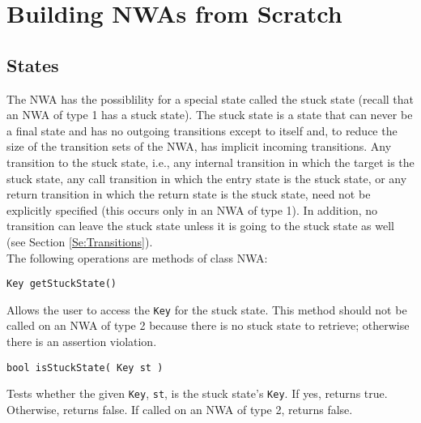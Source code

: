 \section{Building NWAs from Scratch}
\label{Se:Scratch}

\subsection{States}
\label{Se:States}

The NWA has the possiblility for a special state called the stuck state
(recall that an NWA of type 1 has a stuck state).  The stuck state is a state
that can never be a final state and has no outgoing transitions except to
itself and, to reduce the size of the transition sets of the NWA, has
implicit incoming transitions.  Any transition to the stuck state, i.e., any
internal transition in which the target is the stuck state, any call
transition in which the entry state is the stuck state, or any return
transition in which the return state is the stuck state, need not be
explicitly specified (this occurs only in an NWA of type 1).  In addition, no
transition can leave the stuck state unless it is going to the stuck state as
well (see Section \ref{Se:Transitions}). \\

\goodbreak
\noindent The following operations are methods of class NWA:

\begin{description}

  \item\texttt{Key getStuckState()} \nopagebreak

    Allows the user to access the \texttt{Key} for the stuck state.  This
    method should not be called on an NWA of type 2 because there is no stuck
    state to retrieve; otherwise there is an assertion violation.

  \item\texttt{bool isStuckState( Key st )} \nopagebreak

    Tests whether the given \texttt{Key}, \texttt{st}, is the stuck state's
    \texttt{Key}.  If yes, returns true.  Otherwise, returns false.  If
    called on an NWA of type 2, returns false. \\

\end{description}


